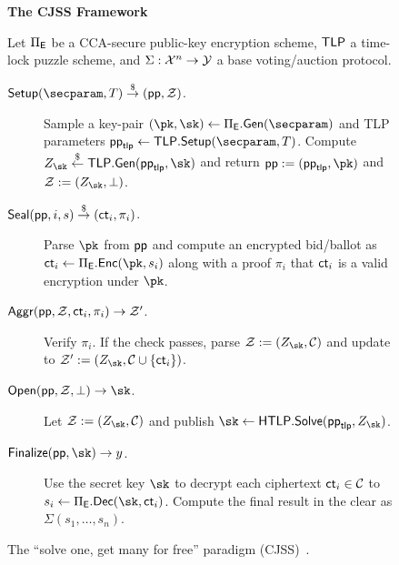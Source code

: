 \begin{figure}[ht]
\begin{mdframed}
\begin{center}
    \textbf{The CJSS Framework}
\end{center}
Let $\Pi_{\sf E}$ be a CCA-secure public-key encryption scheme, $\mathsf{TLP}$ a time-lock puzzle scheme, and $\Sigma: \mathcal{X}^n \rightarrow \mathcal{Y}$ a base voting/auction protocol.
\begin{description}
    \item[$\mathsf{Setup}(\secparam, \Ttime) \randout (\pp, \Z)$.] Sample a key-pair $(\pk, \sk) \gets \Pi_{\sf E}.{\sf Gen}(\secparam)$ and TLP parameters $\pp_{\sf tlp} \gets \tlp.\Setup(\secparam, \Ttime)$. Compute $Z_{\sk} \sample \tlp.\mathsf{Gen}(\pp_{\sf tlp},\sk)$ and return $\pp := (\pp_{\sf tlp}, \pk)$ and $\Z := (Z_{\sk}, \perp)$.
    \item[$\mathsf{Seal}(\mathsf{pp}, i, s) \stackrel{\$}{\to} (\mathsf{ct}_i, \pi_{i})$.] Parse $\pk$ from $\mathsf{pp}$ and compute an encrypted bid/ballot as $\ct_i \gets \Pi_{\sf E}.\enc(\pk,s_i)$ along with a proof $\pi_{i}$ that $\mathsf{ct}_i$ is a valid encryption under $\pk$.
    \item[$\mathsf{Aggr}(\mathsf{pp}, \mathcal{Z}, \mathsf{ct}_{i}, \pi_{i}) \rightarrow \mathcal{Z}'$.] Verify $\pi_{i}$. If the check passes, parse $\Z := (Z_{\sk}, \mathcal{C})$ and update to $\Z' := (Z_{\sk}, \mathcal{C} \cup \{ \ct_{i} \})$.
    \item[$\Open(\pp,\Z,\perp) \rightarrow \sk$.] Let $\Z := (Z_{\sk}, \mathcal{C})$ and publish $\sk \leftarrow \htlp.\mathsf{Solve}(\pp_{\sf tlp},Z_{\sk})$.
    \item[$\Finalize(\pp,\sk) \rightarrow y$.] Use the secret key $\sk$ to decrypt each ciphertext $\mathsf{ct}_i \in \mathcal{C}$ to $s_i \gets \Pi_{\sf E}.\dec(\sk, \ct_i)$. Compute the final result in the clear as $\Sigma(s_1, \dots, s_n)$.
\end{description}
\end{mdframed}
\caption{The ``solve one, get many for free'' paradigm (CJSS)~\cite{ESORICS:CJSS21}.}
\label{fig:solve_one_protocol}
\end{figure}
